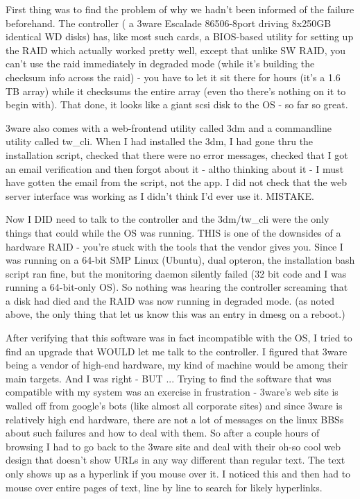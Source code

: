 \documentclass[12pt,twoside]{article}
\begin{document}
First thing was to find the problem of why we hadn't been informed of the 
failure beforehand.  
The controller ( a 3ware Escalade 86506-8port driving 8x250GB identical WD 
disks) has, like most such cards, a BIOS-based utility for setting up the 
RAID which actually worked pretty well, except that unlike SW RAID, you can't 
use the raid immediately in degraded mode (while it's building the checksum 
info across the raid) - you have to let it sit there for hours (it's a 1.6 TB 
array) while it checksums the entire array (even tho there's nothing on it to 
begin with).  That done, it looks like a giant scsi disk to the OS - so far 
so great.

3ware also comes with a web-frontend utility called 3dm and a commandline 
utility called tw\_cli.  When I had installed the 3dm, I had gone thru the 
installation script, checked that there were no error messages, checked that 
I got an email verification and then forgot about it - altho thinking about 
it - I must have gotten the email from the script, not the app.  I did not 
check that the web server interface was working as I didn't think I'd ever 
use it.  MISTAKE.

Now I DID need to talk to the controller and the 3dm/tw\_cli were the only 
things that could while the OS was running.  THIS is one of the downsides of 
a hardware RAID - you're stuck with the tools that the vendor gives you.  
Since I was running on a 64-bit SMP Linux (Ubuntu), dual opteron, the 
installation bash script ran fine, but the monitoring daemon silently failed 
(32 bit code and I was running a 64-bit-only OS).  So nothing was hearing the 
controller screaming that a disk had died and the RAID was now running in 
degraded mode.  (as noted above, the only thing that let us know this was an 
entry in dmesg on a reboot.)

After verifying that this software was in fact incompatible with the OS, I 
tried to find an upgrade that WOULD let me talk to the controller.  I figured 
that 3ware being a vendor of high-end hardware, my kind of machine would be 
among their main targets.  And I was right - BUT ... Trying to find the 
software that was compatible with my system was an exercise in frustration - 
3ware's web site is walled off from google's bots (like almost all corporate 
sites) and since 3ware is relatively high end hardware, there are not a lot 
of messages on the linux BBSs about such failures and how to deal with them.  
So after a couple hours of browsing I had to go back to the 3ware site and 
deal with their oh-so cool web design that doesn't show URLs in any way 
different than regular text.  The text only shows up as a hyperlink if you 
mouse over it.  I noticed this and then had to mouse over entire pages of 
text, line by line to search for likely hyperlinks.  
\end{document}
